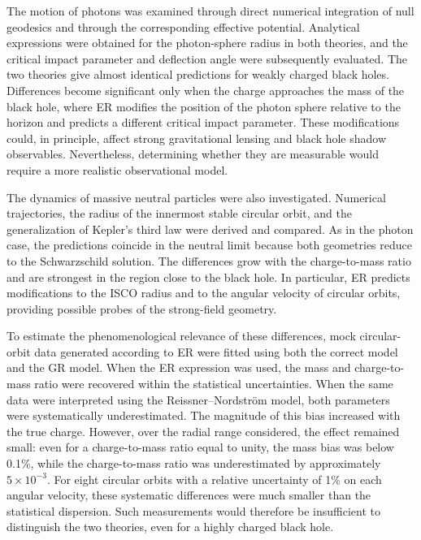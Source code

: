 \documentclass[floats,floatfix,aps, preprintnumbers,nofootinbib]{revtex4-2}
\begin{document}
The motion of photons was examined through direct numerical integration of null geodesics and through the corresponding effective potential. Analytical expressions were obtained for the photon-sphere radius in both theories, and the critical impact parameter and deflection angle were subsequently evaluated. The two theories give almost identical predictions for weakly charged black holes. Differences become significant only when the charge approaches the mass of the black hole, where ER modifies the position of the photon sphere relative to the horizon and predicts a different critical impact parameter. These modifications could, in principle, affect strong gravitational lensing and black hole shadow observables. Nevertheless, determining whether they are measurable would require a more realistic observational model.

The dynamics of massive neutral particles were also investigated. Numerical trajectories, the radius of the innermost stable circular orbit, and the generalization of Kepler’s third law were derived and compared. As in the photon case, the predictions coincide in the neutral limit because both geometries reduce to the Schwarzschild solution. The differences grow with the charge-to-mass ratio and are strongest in the region close to the black hole. In particular, ER predicts modifications to the ISCO radius and to the angular velocity of circular orbits, providing possible probes of the strong-field geometry.

To estimate the phenomenological relevance of these differences, mock circular-orbit data generated according to ER were fitted using both the correct model and the GR model. When the ER expression was used, the mass and charge-to-mass ratio were recovered within the statistical uncertainties. When the same data were interpreted using the Reissner–Nordström model, both parameters were systematically underestimated. The magnitude of this bias increased with the true charge. However, over the radial range considered, the effect remained small: even for a charge-to-mass ratio equal to unity, the mass bias was below 0.1\%, while the charge-to-mass ratio was underestimated by approximately $5\times10^{-3}$. For eight circular orbits with a relative uncertainty of 1\% on each angular velocity, these systematic differences were much smaller than the statistical dispersion. Such measurements would therefore be insufficient to distinguish the two theories, even for a highly charged black hole.
\end{document}
